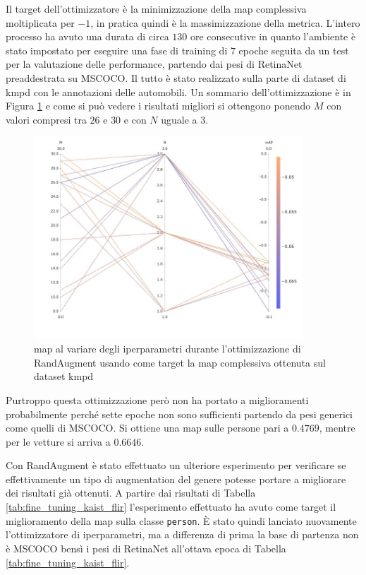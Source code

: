 Il target dell'ottimizzatore è la minimizzazione della \ac{map} complessiva moltiplicata per $-1$, in pratica quindi è la massimizzazione della metrica. L'intero processo ha avuto una durata di circa $130$ ore consecutive in quanto l'ambiente è stato impostato per eseguire una fase di training di $7$ epoche seguita da un test per la valutazione delle performance, partendo dai pesi di RetinaNet preaddestrata su \ac{MSCOCO}. Il tutto è stato realizzato sulla parte di dataset di \ac{kmpd} con le annotazioni delle automobili. Un sommario dell'ottimizzazione è in Figura \ref{fig:map_comet_ml} e come si può vedere i risultati migliori si ottengono ponendo $M$ con valori compresi tra $26$ e $30$ e con $N$ uguale a $3$.
\begin{figure}[]
    \centering
    \includegraphics[width=0.9\textwidth]{images/graphic/mAP_comet.jpeg}
    \caption{\ac{map} al variare degli iperparametri durante l'ottimizzazione di RandAugment usando come target la \ac{map} complessiva ottenuta sul dataset \ac{kmpd}}
    \label{fig:map_comet_ml}
\end{figure}

Purtroppo questa ottimizzazione però non ha portato a miglioramenti probabilmente perché sette epoche non sono sufficienti partendo da pesi generici come quelli di \ac{MSCOCO}. Si ottiene una \ac{map} sulle persone pari a $0.4769$, mentre per le vetture si arriva a $0.6646$. 

Con RandAugment è stato effettuato un ulteriore esperimento per verificare se effettivamente un tipo di augmentation del genere potesse portare a migliorare dei risultati già ottenuti. A partire dai risultati di Tabella \ref{tab:fine_tuning_kaist_flir} l'esperimento effettuato ha avuto come target il miglioramento della \ac{map} sulla classe \texttt{person}. 
È stato quindi lanciato nuovamente l'ottimizzatore di iperparametri, ma a differenza di prima la base di partenza non è \ac{MSCOCO} bensì i pesi di RetinaNet all'ottava epoca di Tabella \ref{tab:fine_tuning_kaist_flir}. 


